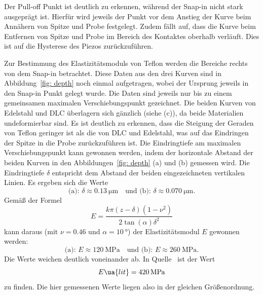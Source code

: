 Der Pull-off Punkt ist deutlich zu erkennen, während der Snap-in nicht stark ausgeprägt ist. Hierfür wird
jeweils der Punkt vor dem Anstieg der Kurve beim Annähern von Spitze und Probe festgelegt. Zudem fällt auf, dass
die Kurve beim Entfernen von Spitze und Probe im Bereich des Kontaktes oberhalb verläuft. Dies ist auf die
Hysterese des Piezos zurückzuführen.

Zur Bestimmung des Elastizitätsmoduls von Teflon werden die Bereiche rechts von dem Snap-in betrachtet. Diese Daten aus den drei Kurven sind
in Abbildung~\ref{fig: depth} noch einmal aufgetragen, wobei der Ursprung jeweils in den Snap-in Punkt gelegt wurde. Die Daten sind
jeweils nur bis zu einem gemeinsamen maximalen Verschiebungspunkt gezeichnet.
Die beiden Kurven von Edelstahl und DLC überlagern sich gänzlich (siehe (c)), da beide Materialien undeformierbar sind.
Es ist deutlich zu erkennen, dass
die Steigung der Geraden von Teflon geringer ist als die von DLC und Edelstahl, was auf das Eindringen der Spitze in die Probe zurückzuführen ist.
Die Eindringtiefe am maximalen Verschiebungspunkt kann gewonnen werden, indem der horizontale Abstand der beiden Kurven in den Abbildungen~\ref{fig: depth}
(a) und (b) gemessen wird. Die Eindringtiefe $\delta$ entspricht dem Abstand der beiden eingezeichneten vertikalen Linien.
Es ergeben sich die Werte
\begin{equation}
  \text{(a): } \delta \approx \SI{0.13}{\micro\meter} \quad \text{und (b): }\delta \approx \SI{0.070}{\micro\meter}.
\end{equation}
Gemäß der Formel%
\begin{equation}
  E =  \frac{k  \pi (z - \delta)    (1 - \nu^2)}{ 2  \tan(\alpha)  \delta^2}
\end{equation}
kann daraus (mit $\nu = \num{0.46}$ und $\alpha = \SI{10}{\degree}$) der Elastizitätsmodul $E$ gewonnen werden:
\begin{equation}
  \text{(a): } E \approx \SI{120}{\mega \pascal} \quad \text{und (b): } E \approx \SI{260}{\mega \pascal}.
\end{equation}
Die Werte weichen deutlich voneinander ab.
In Quelle~\cite{emodulteflon} ist der Wert
\begin{equation}
  E\ua{lit} = \SI{420}{\mega \pascal}
\end{equation}
zu finden. Die hier gemessenen Werte liegen also in der gleichen Größenordnung.

